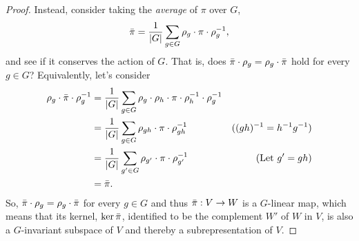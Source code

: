 \begin{proof}
	Instead, consider taking the \textit{average} of $\pi$ over $G$,
	\begin{align*}
		\bar{\pi} = \frac{1}{|G|} \sum_{g \in G} \rho_g \cdot \pi \cdot \rho_g^{-1},
	\end{align*}
	and see if it conserves the action of $G$. That is, does $\bar{\pi}\cdot \rho_g = \rho_g \cdot \bar{\pi}$ hold for every $g \in G$? Equivalently, let's consider
	\begin{align*}
		\rho_g \cdot \bar{\pi} \cdot \rho_g^{-1} &= \frac{1}{|G|} \sum_{g \in G} \rho_g \cdot \rho_h \cdot \pi \cdot \rho_h^{-1} \cdot \rho_g^{-1} \\
		&= \frac{1}{|G|} \sum_{g \in G} \rho_{gh} \cdot \pi \cdot \rho_{gh}^{-1} & \text{($(gh)^{-1}=h^{-1}g^{-1}$)}\\
		&= \frac{1}{|G|} \sum_{g' \in G} \rho_{g'} \cdot \pi \cdot \rho_{g'}^{-1} & \text{(Let $g' = gh$)} \\
		&= \bar{\pi}.
	\end{align*}
	So, $\bar{\pi} \cdot \rho_g = \rho_g \cdot \bar{\pi}$ for every $g \in G$ and thus $\bar{\pi}: V \rightarrow W$ is a $G$-linear map, which means that its kernel, $\ker \bar{\pi}$, identified to be the complement $W'$ of $W$ in $V$, is also a $G$-invariant subspace of $V$ and thereby a subrepresentation of $V$. 

\end{proof}

